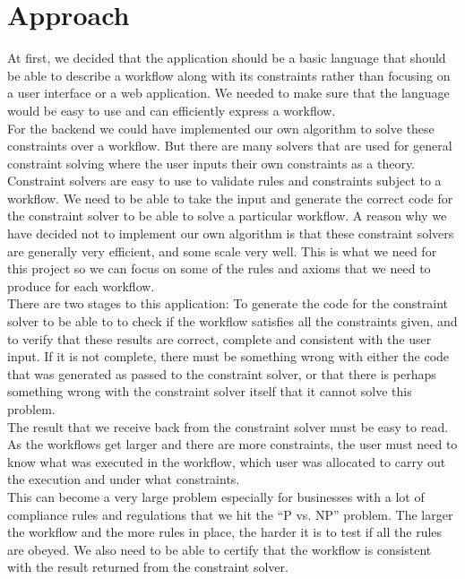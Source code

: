 \documentclass[a4paper]{report}
\begin{document}
\section{Approach}
At first, we decided that the application should be a basic language that should be able to describe a workflow along with its constraints rather than focusing on a user interface or a web application. We needed to make sure that the language would be easy to use and can efficiently express a workflow. \\

For the backend we could have implemented our own algorithm to solve these constraints over a workflow. But there are many solvers that are used for general constraint solving where the user inputs their own constraints as a theory. Constraint solvers are easy to use to validate rules and constraints subject to a workflow. We need to be able to take the input and generate the correct code for the constraint solver to be able to solve a particular workflow. A reason why we have decided not to implement our own algorithm is that these constraint solvers are generally very efficient, and some scale very well. This is what we need for this project so we can focus on some of the rules and axioms that we need to produce for each workflow. \\

There are two stages to this application: To generate the code for the constraint solver to be able to to check if the workflow satisfies all the constraints given, and to verify that these results are correct, complete and consistent with the user input. If it is not complete, there must be something wrong with either the code that was generated as passed to the constraint solver, or that there is perhaps something wrong with the constraint solver itself that it cannot solve this problem. \\

The result that we receive back from the constraint solver must be easy to read. As the workflows get larger and there are more constraints, the user must need to know what was executed in the workflow, which user was allocated to carry out the execution and under what constraints. \\

This can become a very large problem especially for businesses with a lot of compliance rules and regulations that we hit the ``P vs. NP'' problem. The larger the workflow and the more rules in place, the harder it is to test if all the rules are obeyed. We also need to be able to certify that the workflow is consistent with the result returned from the constraint solver. \\
\end{document}
